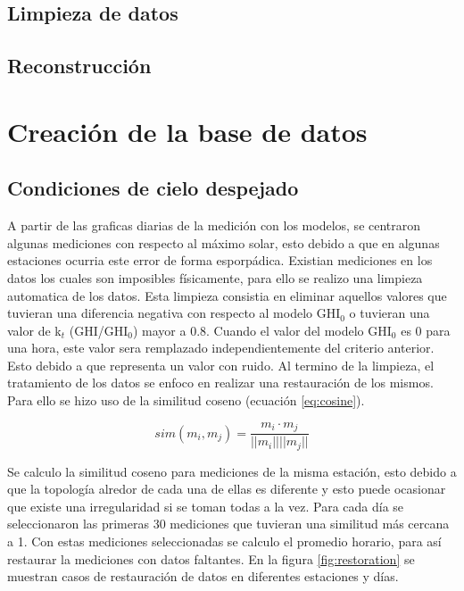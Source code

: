 \subsection{Limpieza de datos}
\subsection{Reconstrucción}
\section{Creación de la base de datos}
\subsection{Condiciones de cielo despejado}

A partir de las graficas diarias de la medición con los modelos, se centraron algunas mediciones con respecto al máximo solar, esto debido a que en algunas estaciones ocurria este error de forma esporpádica. Existian mediciones en los datos los cuales son imposibles físicamente, para ello se realizo una limpieza automatica de los datos. Esta limpieza consistia en eliminar aquellos valores que tuvieran una diferencia negativa con respecto al modelo GHI$_0$ o tuvieran una valor de k$_t$ (GHI/GHI$_0$) mayor a 0.8. Cuando el valor del modelo GHI$_0$ es 0 para una hora, este valor sera remplazado independientemente del criterio anterior. Esto debido a que representa un valor con ruido. Al termino de la limpieza, el tratamiento de los datos se enfoco en realizar una restauración de los mismos. Para ello se hizo uso de la similitud coseno (ecuación \ref{eq:cosine}).


\begin{equation}
	sim(m_i , m_j ) = \frac{m_i \cdot m_j}{||m_i|| ||m_j||}
	\label{eq:cosine}
\end{equation}

Se calculo la similitud coseno para mediciones de la misma estación, esto debido a que la topología alredor de cada una de ellas es diferente y esto puede ocasionar que existe una irregularidad si se toman todas a la vez. Para cada día se seleccionaron las primeras 30 mediciones que tuvieran una similitud más cercana a 1. Con estas mediciones seleccionadas se calculo el promedio horario, para así restaurar la mediciones con datos faltantes. En la figura \ref{fig:restoration} se muestran casos de restauración de datos en diferentes estaciones y días.

